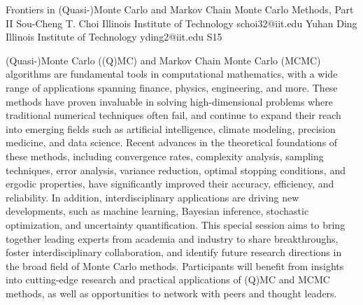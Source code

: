 \begin{session}
 {Frontiers in (Quasi-)Monte Carlo and Markov Chain Monte Carlo Methods, Part II}%
 {Sou-Cheng T. Choi}%
 {Illinois Institute of Technology}%
 {schoi32@iit.edu}%
 {Yuhan Ding}%
 {Illinois Institute of Technology}%
 {yding2@iit.edu}%
 {S15}%
{}

 (Quasi-)Monte Carlo ((Q)MC) and Markov Chain Monte Carlo (MCMC) algorithms are fundamental tools in computational mathematics, with a wide range of applications spanning finance, physics, engineering, and more. These methods have proven invaluable in solving high-dimensional problems where traditional numerical techniques often fail, and continue to expand their reach into emerging fields such as artificial intelligence, climate modeling, precision medicine, and data science.
 Recent advances in the theoretical foundations of these methods, including convergence rates, complexity analysis, sampling techniques, error analysis, variance reduction, optimal stopping conditions, and ergodic properties, have significantly improved their accuracy, efficiency, and reliability. In addition, interdisciplinary applications are driving new developments, such as machine learning, Bayesian inference, stochastic optimization, and uncertainty quantification.
 This special session aims to bring together leading experts from academia and industry to share breakthroughs, foster interdisciplinary collaboration, and identify future research directions in the broad field of Monte Carlo methods. Participants will benefit from insights into cutting-edge research and practical applications of (Q)MC and MCMC methods, as well as opportunities to network with peers and thought leaders.
\end{session}



\clearpage

